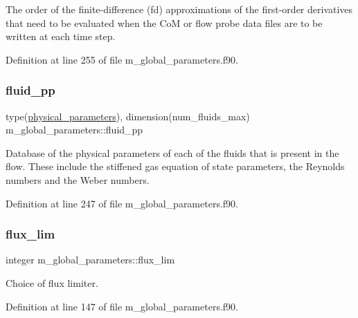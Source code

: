 The order of the finite-\/difference (fd) approximations of the first-\/order derivatives that need to be evaluated when the CoM or flow probe data files are to be written at each time step. 



Definition at line 255 of file m\+\_\+global\+\_\+parameters.\+f90.

\mbox{\label{namespacem__global__parameters_a7297abec8863ecabf95e24ebdae46a17}} 
\subsubsection{\texorpdfstring{fluid\+\_\+pp}{fluid\_pp}}
{\footnotesize\ttfamily type(\hyperlink{structm__derived__types_1_1physical__parameters}{physical\+\_\+parameters}), dimension(num\+\_\+fluids\+\_\+max) m\+\_\+global\+\_\+parameters\+::fluid\+\_\+pp}



Database of the physical parameters of each of the fluids that is present in the flow. These include the stiffened gas equation of state parameters, the Reynolds numbers and the Weber numbers. 



Definition at line 247 of file m\+\_\+global\+\_\+parameters.\+f90.

\mbox{\label{namespacem__global__parameters_acbb163a79ff0011a4327c3fb65a04c14}} 
\subsubsection{\texorpdfstring{flux\+\_\+lim}{flux\_lim}}
{\footnotesize\ttfamily integer m\+\_\+global\+\_\+parameters\+::flux\+\_\+lim}



Choice of flux limiter. 



Definition at line 147 of file m\+\_\+global\+\_\+parameters.\+f90.

\mbox{\label{namespacem__global__parameters_aadeb708160fdfee48fe55e83e41b5064}} 
